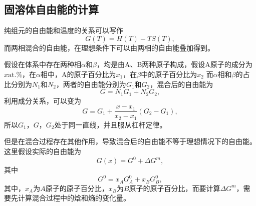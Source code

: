             \subsection{固溶体自由能的计算}
                纯组元的自由能和温度的关系可以写作
                \begin{equation}
                    G(T)=H(T)-TS(T),
                \end{equation}
                而两相混合的自由能，在理想条件下可以由两相的自由能叠加得到。

                假设在体系中存在两种相$\alpha$和$\beta$，均是由A、B两种原子构成，假设A原子的成分为$x\mathrm{at.}\%$，在$\alpha$相中，A的原子百分比为$x_1$，在$\beta$中的原子百分比为$x_2$
                而$\alpha$相和$\beta$的占比分别为$N_1$和$N_2$，两者的自由能分别为$G_1$和$G_2$，混合后的自由能为
                \begin{equation}
                    G=N_1G_1+N_2G_2,
                \end{equation}
                利用成分关系，可以变为
                \begin{equation}
                    G=G_1+\frac{x-x_1}{x_2-x_1}(G_2-G_1),
                \end{equation}
                所以$G_1$，$G$，$G_2$处于同一直线，并且服从杠杆定律。

                但是在混合过程存在其他作用，导致混合后的自由能不等于理想情况下的自由能。这里假设实际的自由能为
                \begin{equation}
                    G(x)=G^0+\Delta G^m,
                \end{equation}
                其中
                \begin{equation}
                    G^0=x_AG_A^0+x_BG_B^0,
                \end{equation}
                其中，$x_A$为$A$原子的原子百分比，$x_B$为$B$原子的原子百分比，而要计算$\Delta G^m$，需要先计算混合过程中的焓和熵的变化量。
